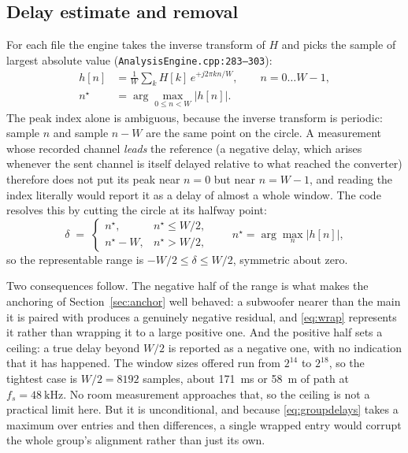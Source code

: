 \documentclass[11pt,a4paper]{article}
\newcommand{\srcref}[2]{\texttt{\small #1}\discretionary{}{}{}\texttt{\small :#2}}
\begin{document}
\subsection{Delay estimate and removal}
\label{sec:peakpick}

For each file the engine takes the inverse transform of $H$ and picks the sample
of largest absolute value (\srcref{AnalysisEngine.cpp}{283--303}):
%
\begin{align}
  h[n] &= \frac{1}{W}\sum_{k} H[k]\, e^{+j2\pi k n/W}, \qquad n = 0\ldots W-1,\\
  n^\star &= \arg\max_{0 \le n < W} \bigl| h[n] \bigr| .
  \label{eq:peak}
\end{align}
%
The peak index alone is ambiguous, because the inverse transform is periodic:
sample $n$ and sample $n-W$ are the same point on the circle. A measurement
whose recorded channel \emph{leads} the reference (a negative delay, which
arises whenever the sent channel is itself delayed relative to what reached the
converter) therefore does not put its peak near $n = 0$ but near $n = W-1$,
and reading the index literally would report it as a delay of almost a whole
window. The code resolves this by cutting the circle at its halfway point:
%
\begin{equation}
  \delta \;=\;
  \begin{cases}
    n^\star, & n^\star \le W/2,\\[2pt]
    n^\star - W, & n^\star > W/2,
  \end{cases}
  \qquad n^\star = \arg\max_n |h[n]|,
  \label{eq:wrap}
\end{equation}
%
so the representable range is $-W/2 \le \delta \le W/2$, symmetric about zero.

Two consequences follow. The negative half of the range is what makes the
anchoring of Section~\ref{sec:anchor} well behaved: a subwoofer nearer than the
main it is paired with produces a genuinely negative residual, and
\eqref{eq:wrap} represents it rather than wrapping it to a large positive one.
And the positive half sets a ceiling: a true delay beyond $W/2$ is reported as a
negative one, with no indication that it has happened. The window sizes offered
run from $2^{14}$ to $2^{18}$, so the tightest case is $W/2 = 8192$ samples,
about \SI{171}{\milli\second} or \SI{58}{\metre} of path at
$f_s = \SI{48}{\kilo\hertz}$. No room measurement approaches that, so the
ceiling is not a practical limit here. But it is unconditional, and because
\eqref{eq:groupdelays} takes a maximum over entries and then differences, a
single wrapped entry would corrupt the whole group's alignment rather than just
its own.
\end{document}
